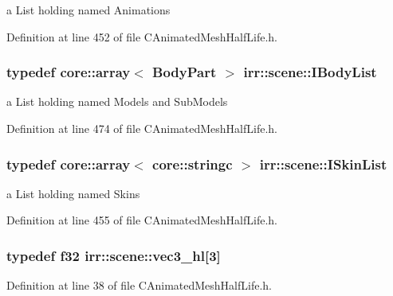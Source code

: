 a List holding named Animations 



Definition at line 452 of file C\-Animated\-Mesh\-Half\-Life.\-h.

\hypertarget{namespaceirr_1_1scene_af44e95def4b0a3d4b69b3a0c3b3cbc2a}{
\subsubsection[{I\-Body\-List}]{\setlength{\rightskip}{0pt plus 5cm}typedef core\-::array$<$ {\bf Body\-Part} $>$ {\bf irr\-::scene\-::\-I\-Body\-List}}}\label{namespaceirr_1_1scene_af44e95def4b0a3d4b69b3a0c3b3cbc2a}


a List holding named Models and Sub\-Models 



Definition at line 474 of file C\-Animated\-Mesh\-Half\-Life.\-h.

\hypertarget{namespaceirr_1_1scene_a52c062d51167e7fc2138c53b19fdd5a1}{
\subsubsection[{I\-Skin\-List}]{\setlength{\rightskip}{0pt plus 5cm}typedef core\-::array$<$ core\-::stringc $>$ {\bf irr\-::scene\-::\-I\-Skin\-List}}}\label{namespaceirr_1_1scene_a52c062d51167e7fc2138c53b19fdd5a1}


a List holding named Skins 



Definition at line 455 of file C\-Animated\-Mesh\-Half\-Life.\-h.

\hypertarget{namespaceirr_1_1scene_a3b7d6a49ddd097de1db184c2227691f9}{
\subsubsection[{vec3\-\_\-hl}]{\setlength{\rightskip}{0pt plus 5cm}typedef f32 irr\-::scene\-::vec3\-\_\-hl\mbox{[}3\mbox{]}}}\label{namespaceirr_1_1scene_a3b7d6a49ddd097de1db184c2227691f9}


Definition at line 38 of file C\-Animated\-Mesh\-Half\-Life.\-h.

